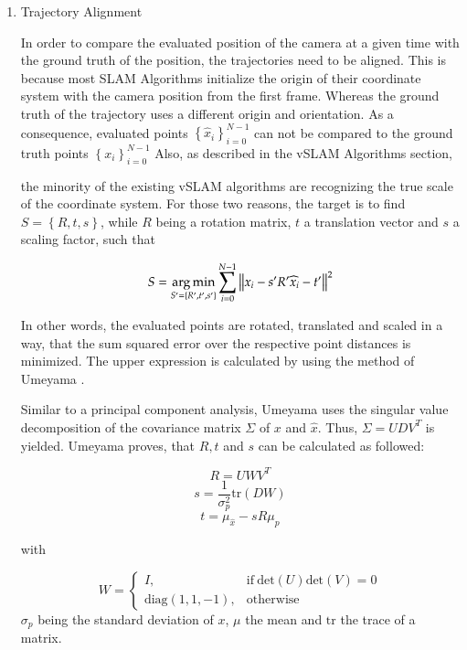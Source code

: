 	\begin{enumerate}
	\item{Trajectory Alignment}\label{umeyamesec}
	
	In order to compare the evaluated position of the camera at a given time with the ground truth of the 
	position, the trajectories need to be aligned. This is because most SLAM Algorithms initialize the origin
	of their coordinate system with the camera position from the first frame. Whereas the ground truth of the 
	trajectory uses a different origin and orientation. As a consequence, evaluated points $ \left\{{\widehat{x}_i}\right\}_{i=0}^{N-1}$ can not be 
	compared to the ground truth points $\left\{{x_i}\right\}_{i=0}^{N-1}$
	Also, as described in the vSLAM Algorithms section,
	
	
	the minority of the existing vSLAM algorithms are recognizing the true scale of the coordinate system. For
	those two reasons, the target is to find $S = \left\{R,t,s\right\}$, while $R$ being a rotation matrix, $t$ a translation vector
	and $s$ a scaling factor, 
	such that
	
	\begin{equation}
	S = \mathop{\mathrm{arg\,min}}_{S' = \left\{R', t', s' \right\}} \sum_{i = 0}^{N-1} \left\lVert x_i - s'R'\widehat{x}_i - t'\right\rVert^2
	\end{equation}\label{alignmin}
	
	In other words, the evaluated points are rotated, translated and scaled in a way, that the sum squared error over the respective point
	distances is minimized. The upper expression is calculated by using the method of Umeyama \cite{ume}. 
	
	Similar to a principal component analysis, Umeyama uses the singular value decomposition of the covariance 
	matrix $\Sigma$ of $x$ and $\widehat{x}$. Thus, 
	$\Sigma = UDV^T$ is yielded. Umeyama proves, that $R,t$ and $s$ can be calculated as followed: 
	
	$$ R = UWV^T $$
	$$ s = \frac{1}{\sigma^2_p}\text{tr}\left(DW\right)$$
	$$ t = \mu_{\widehat{x}} - sR\mu_p $$
	
	with 
	
	$$ W = \begin{cases}
      I, & \text{if}\ \text{det}\left(U\right)\text{det}\left(V\right) =0 \\
      \text{diag}\left(1,1,-1\right), & \text{otherwise}
    \end{cases}$$
	$\sigma_p$ being the standard deviation of $x$, $\mu$ the mean and $\text{tr}$ the trace of a matrix. 
	

\end{enumerate}
